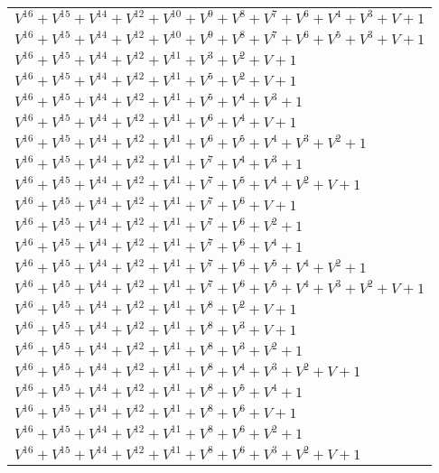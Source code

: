 \documentclass[12pt]{article}
\begin{document}
\begin{adjustwidth}{-4cm}{}
\begin{center}
\begin{longtable}{|l|}
$V^{16}  +V^{15}  +V^{14}  +V^{12}  +V^{10}  +V^{9}  +V^{8}  +V^{7}  +V^{6}  +V^{4}  +V^{3}  + V + 1$ \\
$V^{16}  +V^{15}  +V^{14}  +V^{12}  +V^{10}  +V^{9}  +V^{8}  +V^{7}  +V^{6}  +V^{5}  +V^{3}  + V + 1$ \\
$V^{16}  +V^{15}  +V^{14}  +V^{12}  +V^{11}  +V^{3}  +V^{2}  + V + 1$ \\
$V^{16}  +V^{15}  +V^{14}  +V^{12}  +V^{11}  +V^{5}  +V^{2}  + V + 1$ \\
$V^{16}  +V^{15}  +V^{14}  +V^{12}  +V^{11}  +V^{5}  +V^{4}  +V^{3}  + 1$ \\
$V^{16}  +V^{15}  +V^{14}  +V^{12}  +V^{11}  +V^{6}  +V^{4}  + V + 1$ \\
$V^{16}  +V^{15}  +V^{14}  +V^{12}  +V^{11}  +V^{6}  +V^{5}  +V^{4}  +V^{3}  +V^{2}  + 1$ \\
$V^{16}  +V^{15}  +V^{14}  +V^{12}  +V^{11}  +V^{7}  +V^{4}  +V^{3}  + 1$ \\
$V^{16}  +V^{15}  +V^{14}  +V^{12}  +V^{11}  +V^{7}  +V^{5}  +V^{4}  +V^{2}  + V + 1$ \\
$V^{16}  +V^{15}  +V^{14}  +V^{12}  +V^{11}  +V^{7}  +V^{6}  + V + 1$ \\
$V^{16}  +V^{15}  +V^{14}  +V^{12}  +V^{11}  +V^{7}  +V^{6}  +V^{2}  + 1$ \\
$V^{16}  +V^{15}  +V^{14}  +V^{12}  +V^{11}  +V^{7}  +V^{6}  +V^{4}  + 1$ \\
$V^{16}  +V^{15}  +V^{14}  +V^{12}  +V^{11}  +V^{7}  +V^{6}  +V^{5}  +V^{4}  +V^{2}  + 1$ \\
$V^{16}  +V^{15}  +V^{14}  +V^{12}  +V^{11}  +V^{7}  +V^{6}  +V^{5}  +V^{4}  +V^{3}  +V^{2}  + V + 1$ \\
$V^{16}  +V^{15}  +V^{14}  +V^{12}  +V^{11}  +V^{8}  +V^{2}  + V + 1$ \\
$V^{16}  +V^{15}  +V^{14}  +V^{12}  +V^{11}  +V^{8}  +V^{3}  + V + 1$ \\
$V^{16}  +V^{15}  +V^{14}  +V^{12}  +V^{11}  +V^{8}  +V^{3}  +V^{2}  + 1$ \\
$V^{16}  +V^{15}  +V^{14}  +V^{12}  +V^{11}  +V^{8}  +V^{4}  +V^{3}  +V^{2}  + V + 1$ \\
$V^{16}  +V^{15}  +V^{14}  +V^{12}  +V^{11}  +V^{8}  +V^{5}  +V^{4}  + 1$ \\
$V^{16}  +V^{15}  +V^{14}  +V^{12}  +V^{11}  +V^{8}  +V^{6}  + V + 1$ \\
$V^{16}  +V^{15}  +V^{14}  +V^{12}  +V^{11}  +V^{8}  +V^{6}  +V^{2}  + 1$ \\
$V^{16}  +V^{15}  +V^{14}  +V^{12}  +V^{11}  +V^{8}  +V^{6}  +V^{3}  +V^{2}  + V + 1$ \\

\end{longtable}
\end{center}
\end{adjustwidth}
\end{document}
